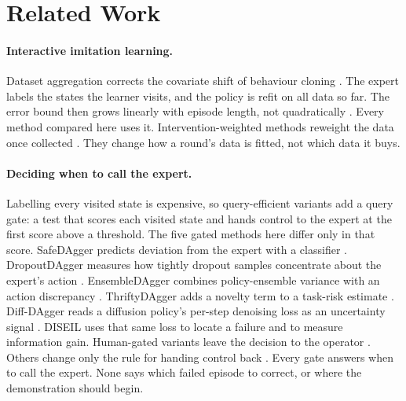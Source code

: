 \section{Related Work}

\paragraph{Interactive imitation learning.}
Dataset aggregation corrects the covariate shift of behaviour cloning
\cite{shimodaira2000covariate}. The expert labels the states the learner visits,
and the policy is refit on all data so far. The error bound then grows linearly
with episode length, not quadratically \cite{ross2010reductions,ross2011dagger}.
Every method compared here uses it. Intervention-weighted methods reweight
the data once collected \cite{mandlekar2020iwr,liu2023sirius}. They change how a
round's data is fitted, not which data it buys.

\paragraph{Deciding when to call the expert.}
Labelling every visited state is expensive, so query-efficient variants add a
query gate: a test that scores each visited state and hands control to the expert
at the first score above a threshold. The five gated methods here differ only in
that score.
SafeDAgger predicts deviation from the expert with a classifier
\cite{zhang2017safedagger}. DropoutDAgger measures how tightly dropout samples
concentrate about the expert's action \cite{menda2017dropoutdagger}.
EnsembleDAgger combines policy-ensemble variance with an action discrepancy
\cite{menda2019ensembledagger}. ThriftyDAgger adds a novelty term to a task-risk
estimate \cite{hoque2021thriftydagger}. Diff-DAgger reads a diffusion policy's
per-step denoising loss \cite{chi2023diffusionpolicy} as an uncertainty signal
\cite{lee2025diffdagger}. DISEIL uses that same loss to locate a failure and to
measure information gain. Human-gated variants leave the decision to the operator
\cite{kelly2019hgdagger}. Others change only the rule for handing control back
\cite{hoque2021lazydagger}. Every gate answers when to call the expert. None says
which failed episode to correct, or where the demonstration should begin.

